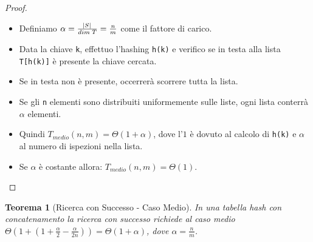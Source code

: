 \documentclass{article}
\newtheorem{theorem}{Teorema}[section]
\begin{document}
\begin{proof}
    $ $\newline
    \begin{itemize}
        \item Definiamo $\alpha = \frac{\abs{S}}{dim \; T} = \frac{n}{m}$ come il fattore di carico.
        \item Data la chiave \verb|k|, effettuo l'hashing \verb|h(k)| e verifico se in testa alla lista \verb|T[h(k)]| è presente la chiave cercata.
        \item Se in testa non è presente, occerrerà scorrere tutta la lista.
        \item Se gli \verb|n| elementi sono distribuiti uniformemente sulle liste, ogni lista conterrà $\alpha$ elementi.
        \item Quindi $T_{medio}(n, m) = \Theta(1 + \alpha)$, dove l'$1$ è dovuto al calcolo di \verb|h(k)| e $\alpha$ al numero di ispezioni nella lista.
        \item Se $\alpha$ è costante allora: $T_{medio}(n, m) = \Theta(1)$.
    \end{itemize}
\end{proof}

\begin{theorem}[Ricerca con Successo - Caso Medio]
    In una tabella hash con concatenamento la ricerca con successo richiede al caso medio $\Theta(1 + (1 + \frac{\alpha}{2} - \frac{\alpha}{2n})) = \Theta(1 + \alpha)$, dove $\alpha = \frac{n}{m}$. 
\end{theorem}
\end{document}
